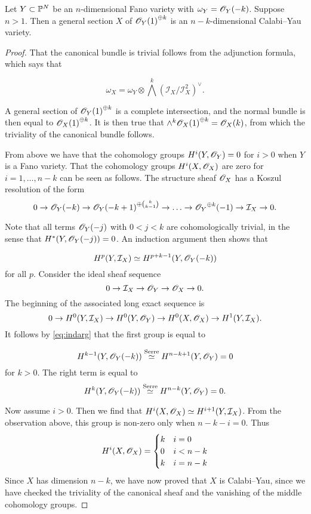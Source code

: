 \begin{proposition}
\label{prop:anticanonicalsection}
Let $Y \subset \P^N$ be an $n$-dimensional Fano variety with $\omega_Y=\OO_Y(-k)$. Suppose $n > 1$. Then a general section $X$ of ${\OO_Y(1)}^{\oplus k}$ is an $n-k$-dimensional Calabi--Yau variety.
\end{proposition}
\begin{proof}
That the canonical bundle is trivial follows from the adjunction formula, which says that

$$
\omega_X = \omega_Y \otimes \bigwedge^k (\mathcal I_X /\mathcal I_X^2)^\vee.
$$

A general section of ${\OO_Y(1)}^{\oplus k}$ is a complete intersection, and the normal bundle is then equal to ${\OO_X(1)}^{\oplus k}$. It is then true that $\wedge^k {\OO_X(1)}^{\oplus k} = \OO_X(k)$, from which the triviality of the canonical bundle follows.

From above we have that the cohomology groups $H^i(Y,\OO_Y)=0$ for $ i> 0$ when $Y$ is a Fano variety. That the cohomology groups $H^i(X,\OO_X)$ are zero for $i=1,\ldots,n-k$ can be seen as follows. The structure sheaf $\OO_X$ has a Koszul resolution of the form
\[
0 \to \OO_Y(-k) \to {\OO_Y(-k+1)}^{\oplus \binom {k}{k-1}} \to \ldots \to {\OO_Y}^{\oplus k}(-1) \to \mathcal I_X \to 0.
\]

Note that all terms $\OO_Y(-j)$ with $0 < j < k$ are cohomologically trivial, in the sense that $H^\ast(Y,\OO_Y(-j))=0$. An induction argument then shows that

\begin{equation}
\label{eq:indarg}
H^p(Y,\mathcal I_X) \simeq H^{p+k-1}(Y,\OO_Y(-k))
\end{equation}
for all $p$. Consider the ideal sheaf sequence
\[
0 \to \mathcal I_X \to \OO_Y \to \OO_X  \to 0.
\]
The beginning of the associated long exact sequence is 
\[
0 \to H^0(Y,\mathcal I_X) \to H^0(Y,\OO_Y) \to H^0(X,\OO_X) \to H^1(Y,\mathcal I_X).
\]
It follows by \eqref{eq:indarg} that the first group is equal to

\[
H^{k-1}(Y,\OO_Y(-k)) \stackrel{\text{Serre}}{\simeq} H^{n-k+1}(Y,\OO_Y)=0\]
for $k > 0$.  The right term is equal to
\[
H^{k}(Y,\OO_Y(-k))  \stackrel{\text{Serre}}{\simeq} H^{n-k}(Y,\OO_Y)=0.
\]

Now assume $i > 0$. Then we find that $H^i(X,\OO_X) \simeq H^{i+1}(Y,\mathcal I_X)$. From the observation above, this group is non-zero only when $n-k-i=0$. Thus
\[
H^i(X,\OO_X) = 
\begin{cases}
k &  i = 0 \\
0 & i < n-k \\
k & i =n-k
\end{cases}
\]
Since $X$ has dimension $n-k$, we have now proved that $X$ is Calabi--Yau, since we have checked the triviality of the canonical sheaf and the vanishing of the middle cohomology groups.
\end{proof}

